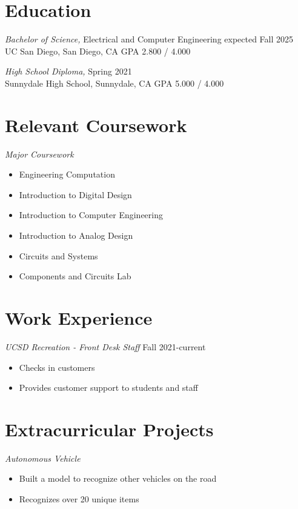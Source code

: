 \documentclass[line,margin]{res}
\begin{document}
\address{9500 Gilman Dr, La Jolla, CA 92093}
\address{e4e@ucsd.edu, (123) 456-7890}

\begin{resume}
    \section{Education}
    {\sl Bachelor of Science,} Electrical and Computer Engineering \hfill expected Fall 2025\\
    UC San Diego, San Diego, CA \hfill GPA 2.800 / 4.000

    {\sl High School Diploma,} \hfill Spring 2021\\
    Sunnydale High School, Sunnydale, CA \hfill GPA 5.000 / 4.000

    \section{Relevant Coursework}
    {\sl Major Coursework}\\
    \begin{itemize}
        \item Engineering Computation
        \item Introduction to Digital Design
        \item Introduction to Computer Engineering
        \item Introduction to Analog Design
        \item Circuits and Systems
        \item Components and Circuits Lab
    \end{itemize}

    \section{Work Experience}
    {\sl UCSD Recreation - Front Desk Staff} \hfill Fall 2021-current\\
    \begin{itemize}
        \item Checks in customers
        \item Provides customer support to students and staff
    \end{itemize}

    \section{Extracurricular Projects}
    {\sl Autonomous Vehicle}
    \begin{itemize}
        \item Built a model to recognize other vehicles on the road
        \item Recognizes over 20 unique items
    \end{itemize}


\end{resume}
\end{document}
